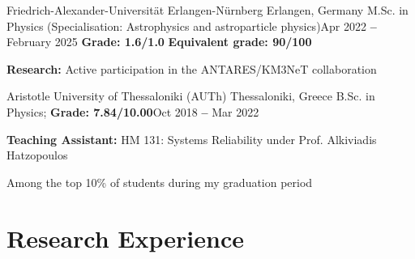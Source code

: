 \documentclass[letterpaper,11pt]{article}
\begin{document}
    \resumeEducationHeading
      {Friedrich-Alexander-Universität Erlangen-Nürnberg
      }{Erlangen, Germany}
      {M.Sc. in Physics (Specialisation: Astrophysics and astroparticle physics)}{Apr 2022 \textbf{--} February 2025}
      {\textbf{Grade: 1.6/1.0} \quad \textbf{Equivalent grade: 90/100}}{}
        \resumeSubHeadingListStart
        \small{\item{
             \textbf{Research:} Active participation in the ANTARES/KM3NeT collaboration}}
        \resumeSubHeadingListEnd

    \resumeSubheading
    {Aristotle University of Thessaloniki (AUTh)
      }{Thessaloniki, Greece}
      {B.Sc. in Physics;
      \textbf{Grade: 7.84/10.00}}{Oct 2018 \textbf{--} Mar 2022}
        \resumeSubHeadingListStart
        \small{\item{
             \textbf{Teaching Assistant:} HM 131: Systems Reliability under Prof. Alkiviadis Hatzopoulos}}
        \small{\item{
            Among the top 10\% of students during my graduation period}}  
        \resumeSubHeadingListEnd
  \resumeSubHeadingListEnd


\section{Research Experience}
  \vspace{3pt}
  \resumeSubHeadingListStart
\end{document}
